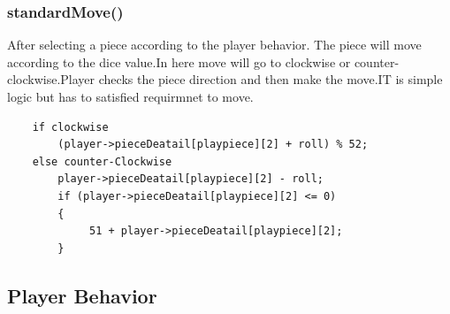 \documentclass{article}
\begin{document}
\subsubsection{standardMove()}
After selecting a piece according to the player behavior. The piece will move according to the dice value.In here move will go to clockwise or counter-clockwise.Player checks the piece direction and then make the move.IT is simple logic but has to satisfied requirmnet to move.
\begin{verbatim}
    if clockwise
        (player->pieceDeatail[playpiece][2] + roll) % 52;
    else counter-Clockwise
        player->pieceDeatail[playpiece][2] - roll;
        if (player->pieceDeatail[playpiece][2] <= 0)
        {
             51 + player->pieceDeatail[playpiece][2];
        }
\end{verbatim}


\newpage

\subsection{Player Behavior}
\end{document}
